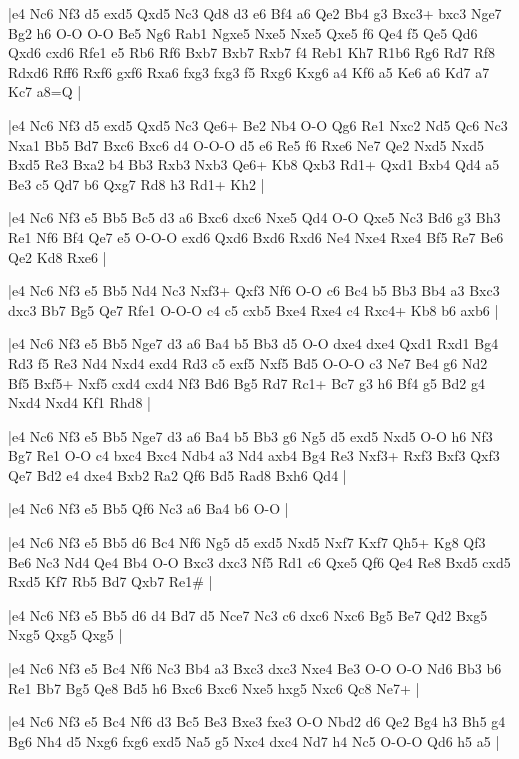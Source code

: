 \whitename{}
\blackname{}
\makegametitle
|e4 Nc6 Nf3 d5 exd5 Qxd5 Nc3 Qd8 d3 e6 Bf4 a6 Qe2 Bb4 g3 Bxc3+ bxc3 Nge7 Bg2 h6 O-O O-O Be5 Ng6 Rab1 Ngxe5 Nxe5 Nxe5 Qxe5 f6 Qe4 f5 Qe5 Qd6 Qxd6 cxd6 Rfe1 e5 Rb6 Rf6 Bxb7 Bxb7 Rxb7 f4 Reb1 Kh7 R1b6 Rg6 Rd7 Rf8 Rdxd6 Rff6 Rxf6 gxf6 Rxa6 fxg3 fxg3 f5 Rxg6 Kxg6 a4 Kf6 a5 Ke6 a6 Kd7 a7 Kc7 a8=Q  |

\whitename{}
\blackname{}
\makegametitle
|e4 Nc6 Nf3 d5 exd5 Qxd5 Nc3 Qe6+ Be2 Nb4 O-O Qg6 Re1 Nxc2 Nd5 Qc6 Nc3 Nxa1 Bb5 Bd7 Bxc6 Bxc6 d4 O-O-O d5 e6 Re5 f6 Rxe6 Ne7 Qe2 Nxd5 Nxd5 Bxd5 Re3 Bxa2 b4 Bb3 Rxb3 Nxb3 Qe6+ Kb8 Qxb3 Rd1+ Qxd1 Bxb4 Qd4 a5 Be3 c5 Qd7 b6 Qxg7 Rd8 h3 Rd1+ Kh2  |

\whitename{}
\blackname{}
\makegametitle
|e4 Nc6 Nf3 e5 Bb5 Bc5 d3 a6 Bxc6 dxc6 Nxe5 Qd4 O-O Qxe5 Nc3 Bd6 g3 Bh3 Re1 Nf6 Bf4 Qe7 e5 O-O-O exd6 Qxd6 Bxd6 Rxd6 Ne4 Nxe4 Rxe4 Bf5 Re7 Be6 Qe2 Kd8 Rxe6  |

\whitename{}
\blackname{}
\makegametitle
|e4 Nc6 Nf3 e5 Bb5 Nd4 Nc3 Nxf3+ Qxf3 Nf6 O-O c6 Bc4 b5 Bb3 Bb4 a3 Bxc3 dxc3 Bb7 Bg5 Qe7 Rfe1 O-O-O c4 c5 cxb5 Bxe4 Rxe4 c4 Rxc4+ Kb8 b6 axb6  |

\whitename{}
\blackname{}
\makegametitle
|e4 Nc6 Nf3 e5 Bb5 Nge7 d3 a6 Ba4 b5 Bb3 d5 O-O dxe4 dxe4 Qxd1 Rxd1 Bg4 Rd3 f5 Re3 Nd4 Nxd4 exd4 Rd3 c5 exf5 Nxf5 Bd5 O-O-O c3 Ne7 Be4 g6 Nd2 Bf5 Bxf5+ Nxf5 cxd4 cxd4 Nf3 Bd6 Bg5 Rd7 Rc1+ Bc7 g3 h6 Bf4 g5 Bd2 g4 Nxd4 Nxd4 Kf1 Rhd8  |

\whitename{}
\blackname{}
\makegametitle
|e4 Nc6 Nf3 e5 Bb5 Nge7 d3 a6 Ba4 b5 Bb3 g6 Ng5 d5 exd5 Nxd5 O-O h6 Nf3 Bg7 Re1 O-O c4 bxc4 Bxc4 Ndb4 a3 Nd4 axb4 Bg4 Re3 Nxf3+ Rxf3 Bxf3 Qxf3 Qe7 Bd2 e4 dxe4 Bxb2 Ra2 Qf6 Bd5 Rad8 Bxh6 Qd4  |

\whitename{}
\blackname{}
\makegametitle
|e4 Nc6 Nf3 e5 Bb5 Qf6 Nc3 a6 Ba4 b6 O-O  |

\whitename{}
\blackname{}
\makegametitle
|e4 Nc6 Nf3 e5 Bb5 d6 Bc4 Nf6 Ng5 d5 exd5 Nxd5 Nxf7 Kxf7 Qh5+ Kg8 Qf3 Be6 Nc3 Nd4 Qe4 Bb4 O-O Bxc3 dxc3 Nf5 Rd1 c6 Qxe5 Qf6 Qe4 Re8 Bxd5 cxd5 Rxd5 Kf7 Rb5 Bd7 Qxb7 Re1\#  |

\whitename{}
\blackname{}
\makegametitle
|e4 Nc6 Nf3 e5 Bb5 d6 d4 Bd7 d5 Nce7 Nc3 c6 dxc6 Nxc6 Bg5 Be7 Qd2 Bxg5 Nxg5 Qxg5 Qxg5  |

\whitename{}
\blackname{}
\makegametitle
|e4 Nc6 Nf3 e5 Bc4 Nf6 Nc3 Bb4 a3 Bxc3 dxc3 Nxe4 Be3 O-O O-O Nd6 Bb3 b6 Re1 Bb7 Bg5 Qe8 Bd5 h6 Bxc6 Bxc6 Nxe5 hxg5 Nxc6 Qc8 Ne7+  |

\whitename{}
\blackname{}
\makegametitle
|e4 Nc6 Nf3 e5 Bc4 Nf6 d3 Bc5 Be3 Bxe3 fxe3 O-O Nbd2 d6 Qe2 Bg4 h3 Bh5 g4 Bg6 Nh4 d5 Nxg6 fxg6 exd5 Na5 g5 Nxc4 dxc4 Nd7 h4 Nc5 O-O-O Qd6 h5 a5  |

